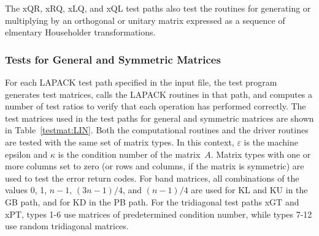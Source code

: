 \noindent
The xQR, xRQ, xLQ, and xQL test paths also test the routines
for generating or multiplying by an orthogonal or unitary matrix
expressed as a sequence of elmentary Householder transformations.

\subsubsection{Tests for General and Symmetric Matrices}
\dent
For each LAPACK test path specified in the input file, the test program
generates test matrices, calls the LAPACK routines in that path, and
computes a number of test ratios to verify that each operation
has performed correctly.
The test matrices used in the test paths for general and symmetric
matrices are shown in Table~\ref{testmat:LIN}.
Both the computational routines and the driver routines are tested
with the same set of matrix types.
In this context, $\varepsilon$ is the machine epsilon and
$\kappa$ is the condition number of the matrix~$A$.
Matrix types with one or more columns set to zero
(or rows and columns, if the matrix is symmetric)
are used to test the error return codes.
For band matrices, all combinations of the values 0, 1, $n-1$,
$(3n-1)/4$, and $(n-1)/4$ are used for $\mbox{KL}$ and $\mbox{KU}$
in the GB path, and for $\mbox{KD}$ in the PB path.
For the tridiagonal test paths xGT and xPT, types 1-6 use matrices
of predetermined condition number, while types 7-12 use random
tridiagonal matrices.

